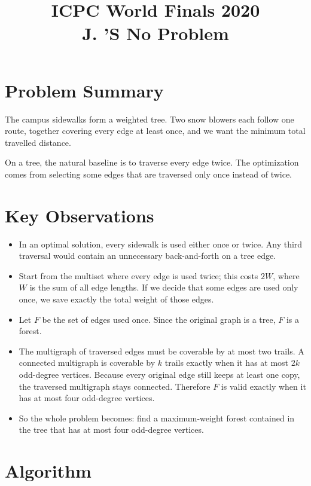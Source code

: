\documentclass[11pt]{article}
\title{ICPC World Finals 2020\\J. ’S No Problem}
\author{}
\date{}
\begin{document}
\maketitle

\section*{Problem Summary}

The campus sidewalks form a weighted tree. Two snow blowers each follow one route, together covering
every edge at least once, and we want the minimum total travelled distance.

On a tree, the natural baseline is to traverse every edge twice. The optimization comes from selecting some
edges that are traversed only once instead of twice.

\section*{Key Observations}

\begin{itemize}[leftmargin=*]
    \item In an optimal solution, every sidewalk is used either once or twice. Any third traversal would contain
    an unnecessary back-and-forth on a tree edge.
    \item Start from the multiset where every edge is used twice; this costs $2W$, where $W$ is the sum of all
    edge lengths. If we decide that some edges are used only once, we save exactly the total weight of those
    edges.
    \item Let $F$ be the set of edges used once. Since the original graph is a tree, $F$ is a forest.
    \item The multigraph of traversed edges must be coverable by at most two trails. A connected multigraph is
    coverable by $k$ trails exactly when it has at most $2k$ odd-degree vertices. Because every original edge
    still keeps at least one copy, the traversed multigraph stays connected. Therefore $F$ is valid exactly
    when it has at most four odd-degree vertices.
    \item So the whole problem becomes: find a maximum-weight forest contained in the tree that has at most
    four odd-degree vertices.
\end{itemize}

\section*{Algorithm}
\end{document}
